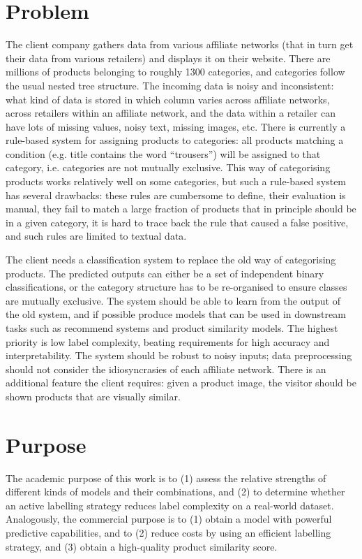 \section{Problem}

The client company gathers data from various affiliate networks (that in turn get their data from various retailers) and displays it on their website.
There are millions of products belonging to roughly 1300 categories, and categories follow the usual nested tree structure.
The incoming data is noisy and inconsistent: what kind of data is stored in which column varies across affiliate networks, across retailers within an affiliate network, and the data within a retailer can have lots of missing values, noisy text, missing images, etc.
There is currently a rule-based system for assigning products to categories: all products matching a condition (e.g. title contains the word ``trousers'') will be assigned to that category, i.e. categories are not mutually exclusive.
This way of categorising products works relatively well on some categories, but such a rule-based system has several drawbacks: these rules are cumbersome to define, their evaluation is manual, they fail to match a large fraction of products that in principle should be in a given category, it is hard to trace back the rule that caused a false positive, and such rules are limited to textual data.

The client needs a classification system to replace the old way of categorising products.
The predicted outputs can either be a set of independent binary classifications, or the category structure has to be re-organised to ensure classes are mutually exclusive.
The system should be able to learn from the output of the old system, and if possible produce models that can be used in downstream tasks such as recommend systems and product similarity models.
The highest priority is low label complexity, beating requirements for high accuracy and interpretability.
The system should be robust to  noisy inputs; data preprocessing should not consider the idiosyncrasies of each affiliate network.
There is an additional feature the client requires: given a product image, the visitor should be shown products that are visually similar.

\section{Purpose}

The academic purpose of this work is to (1) assess the relative strengths of different kinds of models and their combinations, and (2) to determine whether an active labelling strategy reduces label complexity on a real-world dataset. Analogously, the commercial purpose is to (1) obtain a model with powerful predictive capabilities, and to (2) reduce costs by using an efficient labelling strategy, and (3) obtain a high-quality product similarity score.

